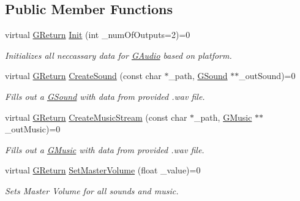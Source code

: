 \subsection*{Public Member Functions}
\begin{DoxyCompactItemize}
\item 
virtual \mbox{\hyperlink{namespace_g_w_a67a839e3df7ea8a5c5686613a7a3de21}{G\+Return}} \mbox{\hyperlink{class_g_w_1_1_a_u_d_i_o_1_1_g_audio_ab4084083e5b785d9a8ed74f768788ca2}{Init}} (int \+\_\+num\+Of\+Outputs=2)=0
\begin{DoxyCompactList}\small\item\em Initializes all neccassary data for \mbox{\hyperlink{class_g_w_1_1_a_u_d_i_o_1_1_g_audio}{G\+Audio}} based on platform. \end{DoxyCompactList}\item 
virtual \mbox{\hyperlink{namespace_g_w_a67a839e3df7ea8a5c5686613a7a3de21}{G\+Return}} \mbox{\hyperlink{class_g_w_1_1_a_u_d_i_o_1_1_g_audio_a79ca24ce2b0b0d619ea465720a702628}{Create\+Sound}} (const char $\ast$\+\_\+path, \mbox{\hyperlink{class_g_w_1_1_a_u_d_i_o_1_1_g_sound}{G\+Sound}} $\ast$$\ast$\+\_\+out\+Sound)=0
\begin{DoxyCompactList}\small\item\em Fills out a \mbox{\hyperlink{class_g_w_1_1_a_u_d_i_o_1_1_g_sound}{G\+Sound}} with data from provided .wav file. \end{DoxyCompactList}\item 
virtual \mbox{\hyperlink{namespace_g_w_a67a839e3df7ea8a5c5686613a7a3de21}{G\+Return}} \mbox{\hyperlink{class_g_w_1_1_a_u_d_i_o_1_1_g_audio_a7a09604e225f901a67748faa3723b2c8}{Create\+Music\+Stream}} (const char $\ast$\+\_\+path, \mbox{\hyperlink{class_g_w_1_1_a_u_d_i_o_1_1_g_music}{G\+Music}} $\ast$$\ast$\+\_\+out\+Music)=0
\begin{DoxyCompactList}\small\item\em Fills out a \mbox{\hyperlink{class_g_w_1_1_a_u_d_i_o_1_1_g_music}{G\+Music}} with data from provided .wav file. \end{DoxyCompactList}\item 
virtual \mbox{\hyperlink{namespace_g_w_a67a839e3df7ea8a5c5686613a7a3de21}{G\+Return}} \mbox{\hyperlink{class_g_w_1_1_a_u_d_i_o_1_1_g_audio_a34fb1be1551ce0e73bdb439e8d7ffcfa}{Set\+Master\+Volume}} (float \+\_\+value)=0
\begin{DoxyCompactList}\small\item\em Sets Master Volume for all sounds and music. \end{DoxyCompactList}\item 

\end{DoxyCompactItemize}
